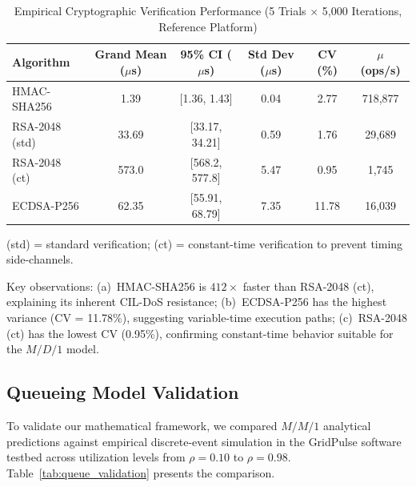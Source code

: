 \documentclass{ieeeaccess}
\begin{document}
\begin{table}[t]
\caption{Empirical Cryptographic Verification Performance (5 Trials $\times$ 5,000 Iterations, Reference Platform)}
\label{tab:crypto_bench}
\centering
\begin{tabular}{lccccc}
\toprule
\textbf{Algorithm} & \textbf{Grand Mean} ($\mu$s) & \textbf{95\% CI} ($\mu$s) & \textbf{Std Dev} ($\mu$s) & \textbf{CV (\%)} & $\mu$ \textbf{(ops/s)} \\
\midrule
HMAC-SHA256 & 1.39 & [1.36, 1.43] & 0.04 & 2.77 & 718,877 \\
RSA-2048 (std)   & 33.69 & [33.17, 34.21] & 0.59 & 1.76 & 29,689 \\
RSA-2048 (ct)    & 573.0 & [568.2, 577.8] & 5.47 & 0.95 & 1,745 \\
ECDSA-P256  & 62.35 & [55.91, 68.79] & 7.35 & 11.78 & 16,039 \\
\bottomrule
\end{tabular}
\vspace{1mm}
\small{(std) = standard verification; (ct) = constant-time verification to prevent timing side-channels.}
\end{table}

Key observations: (a)~HMAC-SHA256 is $412\times$ faster than RSA-2048 (ct), explaining its inherent CIL-DoS resistance; (b)~ECDSA-P256 has the highest variance (CV = 11.78\%), suggesting variable-time execution paths; (c)~RSA-2048 (ct) has the lowest CV (0.95\%), confirming constant-time behavior suitable for the $M/D/1$ model.

\subsection{Queueing Model Validation}
To validate our mathematical framework, we compared $M/M/1$ analytical predictions against empirical discrete-event simulation in the GridPulse software testbed across utilization levels from $\rho = 0.10$ to $\rho = 0.98$. Table~\ref{tab:queue_validation} presents the comparison.
\end{document}
